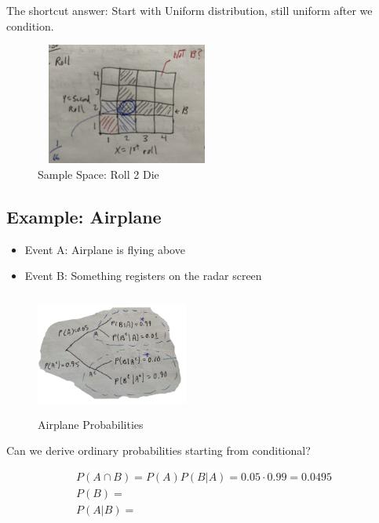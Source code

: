 \documentclass{article}
\begin{document}
 The shortcut answer: Start with Uniform distribution, still uniform after we condition.

\begin{figure}[!ht]
\centering
\includegraphics[width=6cm, height=4cm]{images/L02/dice_roll.jpeg}
\caption{Sample Space: Roll 2 Die}
\end{figure}

\subsection{Example: Airplane}


\begin{itemize}
    \item Event A: Airplane is flying above
    \item Event B: Something registers on the radar screen
\end{itemize}

\begin{figure}[ht]
\centering
\includegraphics[width=5cm, height=4cm]{images/L02/airplane_radar.jpeg}
\caption{Airplane Probabilities}
\end{figure}

Can we derive ordinary probabilities starting from conditional?

\begin{align*}
P(A \cap B) = P(A)P(B|A) = 0.05\cdot 0.99 = 0.0495\\
P(B) =\\
P(A|B) =\\
\end{align*}
\end{document}
